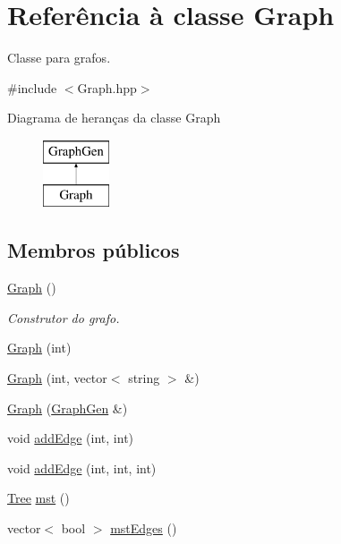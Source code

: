 \hypertarget{classGraph}{}\section{Referência à classe Graph}
\label{classGraph}


Classe para grafos.  




{\ttfamily \#include $<$Graph.\+hpp$>$}

Diagrama de heranças da classe Graph\begin{figure}[H]
\begin{center}
\leavevmode
\includegraphics[height=2.000000cm]{classGraph}
\end{center}
\end{figure}
\subsection*{Membros públicos}
\begin{DoxyCompactItemize}
\item 
\mbox{\label{classGraph_ae4c72b8ac4d693c49800a4c7e273654f}} 
\hyperlink{classGraph_ae4c72b8ac4d693c49800a4c7e273654f}{Graph} ()
\begin{DoxyCompactList}\small\item\em Construtor do grafo. \end{DoxyCompactList}\item 
\hyperlink{classGraph_a6381663d9f8215c377123a3a8107011c}{Graph} (int)
\item 
\hyperlink{classGraph_a0cb28a8601b14d0cb4291e5f60882ffc}{Graph} (int, vector$<$ string $>$ \&)
\item 
\hyperlink{classGraph_a0cd2695bebb326da026ed7391542aba6}{Graph} (\hyperlink{classGraphGen}{Graph\+Gen} \&)
\item 
void \hyperlink{classGraph_a9f627b8aaa697daabe0ed31bbd0953eb}{add\+Edge} (int, int)
\item 
void \hyperlink{classGraph_ad4155b07ec70e1d85787710452a2bcfa}{add\+Edge} (int, int, int)
\item 
\hyperlink{classTree}{Tree} \hyperlink{classGraph_a59f3bafa5e1935a2de4313b43219c4d6}{mst} ()
\item 
vector$<$ bool $>$ \hyperlink{classGraph_a645760818f3f2a20f8593b6b2a65c2d8}{mst\+Edges} ()
\end{DoxyCompactItemize}
